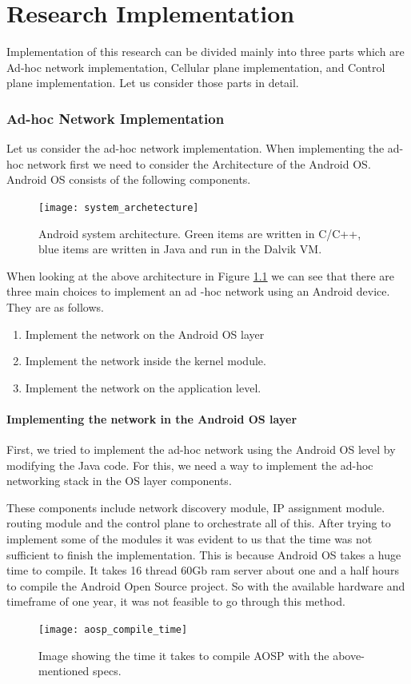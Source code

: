 \chapter[Implementation ]{Research Implementation }
\vspace{5pt}

Implementation of this research can be divided mainly into three parts which are Ad-hoc network implementation, Cellular plane implementation, and Control plane implementation.
Let us consider those parts in detail.

\subsection{Ad-hoc Network Implementation}
Let us consider the ad-hoc network implementation. When implementing the ad-hoc network first we need to consider the Architecture of the Android OS. Android OS consists of the following components.
\begin{figure}[H]
    \centering
    \texttt{[image: system\_archetecture]}
    \caption{ Android system architecture. Green items are written in C/C++, blue
items are written in Java and run in the Dalvik VM.}
    \label{fig:pca_coeff_z_qws_12}
\end{figure}
\vspace{12pt}
\clearpage
When looking at the above architecture in Figure \ref{fig:pca_coeff_z_qws_12} we can see that there are three main choices to implement an ad -hoc network using an Android device. They are as follows.
\begin{enumerate}
  \item Implement the network on the Android OS layer 
  \item Implement the network inside the kernel module.
  \item Implement the network on the application level.
\end{enumerate}
\subsubsection{Implementing the network in the Android OS layer}
First, we tried to implement the ad-hoc network using the Android OS level by modifying the Java code. For this, we need a way to implement the ad-hoc networking stack in the OS layer components.

\vspace{5pt}
These components include network discovery module, IP assignment module. routing module and the control plane to orchestrate all of this. After trying to implement some of the modules it was evident to us that the time was not sufficient to finish the implementation. This is because Android OS takes a huge time to compile. It takes 16 thread 60Gb ram server about one and a half hours to compile the Android Open Source project. So with the available hardware and timeframe of one year, it was not feasible to go through this method.
\begin{figure}[H]
    \centering
    \texttt{[image: aosp\_compile\_time]}
    \caption{Image showing the time it takes to compile AOSP with the above-mentioned specs.}
\end{figure}
\vspace{12pt}
\clearpage
